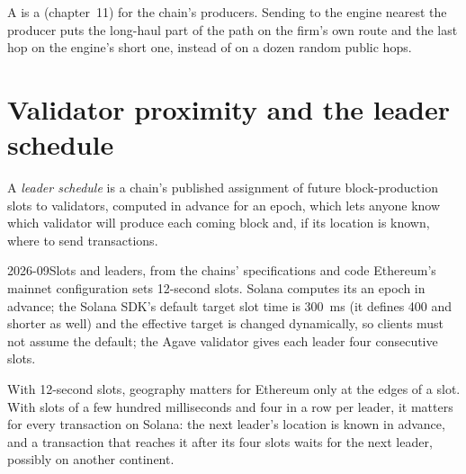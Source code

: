 A  is a  (chapter~11) for the chain's producers. Sending to the engine nearest the producer puts the long-haul part of
the path on the firm's own route and the last hop on the engine's short one, instead of on a dozen random public hops.

\section{Validator proximity and the leader schedule}

\begin{definition}\label{def:nw:on-chain-connectivity:leader}
A \emph{leader schedule} is a chain's published assignment of future block-production slots to validators, computed in
advance for an epoch, which lets anyone know which validator will produce each coming block and, if its location is known, where to send
transactions.
\end{definition}

\begin{dated}{2026-09}{Slots and leaders, from the chains' specifications and code}\label{dat:nw:on-chain-connectivity:chains}
Ethereum's mainnet configuration sets 12-second slots. Solana computes its  an epoch in advance; the Solana SDK's default target
slot time is \qty{300}{\milli\second} (it defines 400 and shorter as well) and the effective target is changed dynamically, so clients must not assume
the default; the Agave validator gives each leader four consecutive slots.
\end{dated}

With 12-second slots, geography matters for Ethereum only at the edges of a slot. With slots of a few hundred milliseconds and four in a row per
leader, it matters for every transaction on Solana: the next leader's location is known in advance, and a transaction that reaches it after its
four slots waits for the next leader, possibly on another continent.

\label{lst:nw:on-chain-connectivity:leader}

